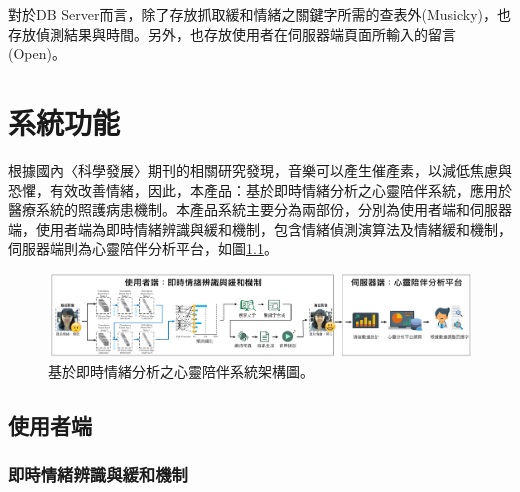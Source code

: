 \documentclass[12pt]{scrreprt}
\begin{document}
對於DB Server而言，除了存放抓取緩和情緒之關鍵字所需的查表外(Musicky)，也存放偵測結果與時間。另外，也存放使用者在伺服器端頁面所輸入的留言(Open)。



\chapter{系統功能}
根據國內〈科學發展〉期刊的相關研究發現，音樂可以產生催產素，以減低焦慮與恐懼，有效改善情緒，因此，本產品：基於即時情緒分析之心靈陪伴系統，應用於醫療系統的照護病患機制。本產品系統主要分為兩部份，分別為使用者端和伺服器端，使用者端為即時情緒辨識與緩和機制，包含情緒偵測演算法及情緒緩和機制，伺服器端則為心靈陪伴分析平台，如圖\ref{fig:framework}。
\begin{figure}[!h]
\begin{center}
\includegraphics[width=1\textwidth]{./figs/framework-version2.pdf}
\end{center}
\vspace{-0.5cm}
\caption{基於即時情緒分析之心靈陪伴系統架構圖。}
\label{fig:framework}
\end{figure}

\vspace{-1cm}

\section{使用者端}

\subsection{即時情緒辨識與緩和機制}
\end{document}

